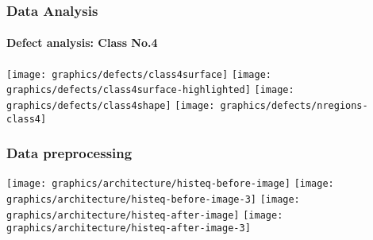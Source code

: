 
    \begin{frame}
        \frametitle{Data Analysis}
        \framesubtitle{Defect analysis: Class No.4}
         {
            \texttt{[image: graphics/defects/class4surface]}
        }
         {
            \texttt{[image: graphics/defects/class4surface-highlighted]}
        }
         {
            \texttt{[image: graphics/defects/class4shape]}
        }
         {
            \texttt{[image: graphics/defects/nregions-class4]}
        }
    \end{frame}

    \begin{frame}
        \frametitle{Data preprocessing}
         {
            \texttt{[image: graphics/architecture/histeq-before-image]}
            \texttt{[image: graphics/architecture/histeq-before-image-3]}
        }
         {
            \texttt{[image: graphics/architecture/histeq-after-image]}
            \texttt{[image: graphics/architecture/histeq-after-image-3]}
        }
    \end{frame}